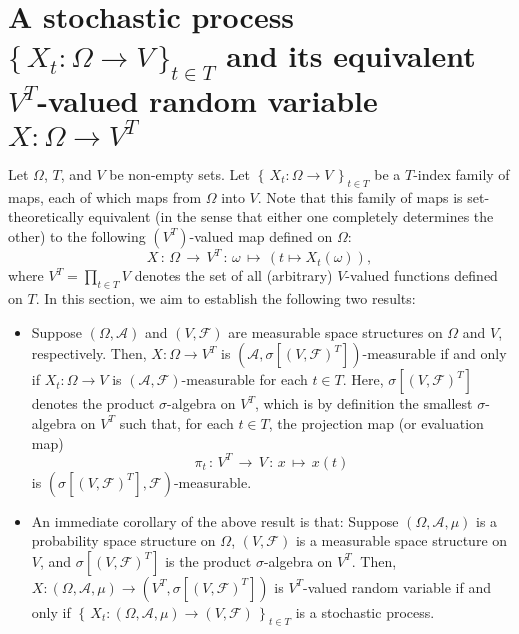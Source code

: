 

\section{A stochastic process $\{\,X_{t} : \Omega \longrightarrow V\,\}_{t\in T}$ and
its equivalent $V^{T}$-valued random variable $X : \Omega \longrightarrow V^{T}$}

\setcounter{theorem}{0}
\setcounter{equation}{0}

Let $\Omega$, $T$, and $V$ be non-empty sets.
Let $\left\{\,X_{t} : \Omega \longrightarrow V \,\right\}_{t \in T}$
be a $T$-index family of maps, each of which maps from $\Omega$ into $V$.
Note that this family of maps is set-theoretically equivalent
(in the sense that either one completely determines the other)
to the following $(V^{T})$-valued map defined on $\Omega$:
\begin{equation*}
X \,:\, \Omega \,\longrightarrow\, V^{T} \,:\, \omega \,\longmapsto\, \left(t \longmapsto X_{t}(\omega)\right),
\end{equation*}
where $V^{T} = \prod_{t\in T}V$ denotes the set of all (arbitrary) $V$-valued functions defined on $T$.
In this section, we aim to establish the following two results:
\begin{itemize}

\item
Suppose $\left(\Omega,\mathcal{A}\right)$ and $\left(V,\mathcal{F}\right)$
are measurable space structures on $\Omega$ and $V$, respectively.
Then, $X : \Omega \longrightarrow V^{T}$ is
$\left(\mathcal{A},\sigma[(V,\mathcal{F})^{T}]\right)$-measurable if and only if
$X_{t} : \Omega \longrightarrow V$ is $(\mathcal{A},\mathcal{F})$-measurable for each $t \in T$.
Here, $\sigma[(V,\mathcal{F})^{T}]$ denotes the product $\sigma$-algebra on $V^{T}$,
which is by definition the smallest $\sigma$-algebra on $V^{T}$ such that,
for each $t \in T$, the projection map (or evaluation map)
\begin{equation*}
\pi_{t} \,:\, V^{T} \, \longrightarrow\, V
\,:\, x \,\longmapsto\, x(t)
\end{equation*}
is $\left(\sigma[(V,\mathcal{F})^{T}],\mathcal{F}\right)$-measurable.

\item
An immediate corollary of the above result is that:
Suppose $\left(\Omega,\mathcal{A},\mu\right)$ is a probability space structure on $\Omega$,
$\left(V,\mathcal{F}\right)$ is a measurable space structure on $V$, and
$\sigma[(V,\mathcal{F})^{T}]$ is the product $\sigma$-algebra on $V^{T}$.
Then, $X : (\Omega,\mathcal{A},\mu) \longrightarrow (V^{T},\sigma[(V,\mathcal{F})^{T}])$ is
$V^{T}$-valued random variable if and only if
$\left\{\,X_{t} : (\Omega,\mathcal{A},\mu) \longrightarrow (V,\mathcal{F})\,\right\}_{t\in T}$
is a stochastic process.

\end{itemize}

